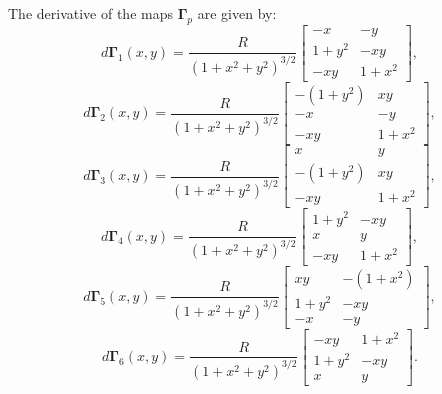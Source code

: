 The derivative of the maps $\boldsymbol{\Gamma}_p$ are given by:
\begin{equation*}
	d\boldsymbol{\Gamma}_{1}(x,y) = \frac{R}{{(1 + x^2 + y^2)}^{3/2}}
	\begin{bmatrix}
		-x & -y \\
	 	 1+y^2  & -xy \\
		 -xy  & 1+x^2
	\end{bmatrix},
\end{equation*}
\begin{equation*}
	d\boldsymbol{\Gamma}_{2}(x,y) = \frac{R}{{(1 + x^2 + y^2)}^{3/2}}
	\begin{bmatrix}
		-(1+y^2) & xy \\
		 -x &  -y \\
		 -xy &  1+x^2
	\end{bmatrix},
\end{equation*}
\begin{equation*}
	d\boldsymbol{\Gamma}_{3}(x,y) = \frac{R}{{(1 + x^2 + y^2)}^{3/2}}
	\begin{bmatrix}
		 x &  y \\
		-(1+y^2) & xy \\
		 -xy &  1+x^2
	\end{bmatrix},
\end{equation*}
\begin{equation*}
	d\boldsymbol{\Gamma}_{4}(x,y) = \frac{R}{{(1 + x^2 + y^2)}^{3/2}}	
	\begin{bmatrix}
		 1+y^2 &  -xy \\
		 x & y \\
		 -xy &  1+x^2
	\end{bmatrix},
\end{equation*}
\begin{equation*}
	d\boldsymbol{\Gamma}_{5}(x,y) = \frac{R}{{(1 + x^2 + y^2)}^{3/2}}	
	\begin{bmatrix}
		 xy  & -(1+x^2) \\
	 	 1+y^2  &  -xy \\
		-x & -y
	\end{bmatrix},
\end{equation*}
\begin{equation*}
	d\boldsymbol{\Gamma}_{6}(x,y) = \frac{R}{{(1 + x^2 + y^2)}^{3/2}}
	\begin{bmatrix}
		 -xy  &  1+x^2 \\
		 1+y^2  &  -xy \\
		 x &  y
	\end{bmatrix}.
\end{equation*}
